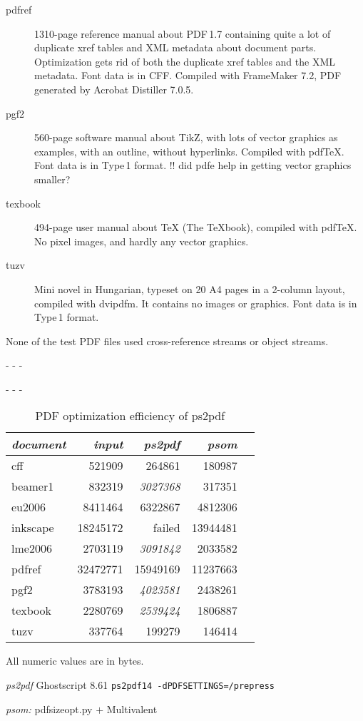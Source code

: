 \documentclass{ltugproc}
\def\cmd{\textsf}
\def\captiontop#1{%
  \advance\abovecaptionskip-\belowcaptionskip
  \advance\belowcaptionskip\abovecaptionskip
  \advance\abovecaptionskip-\belowcaptionskip
  \abovecaptionskip-\abovecaptionskip
  \caption{#1}%
  \advance\abovecaptionskip-\belowcaptionskip
  \advance\belowcaptionskip\abovecaptionskip
  \advance\abovecaptionskip-\belowcaptionskip
  \abovecaptionskip-\abovecaptionskip
}
\begin{document}
\begin{description}
\item[pdfref] 1310-page reference manual about PDF\,1.7 containing quite a
lot of duplicate xref tables and XML metadata about document parts.
Optimization gets rid of both the duplicate xref tables and the XML
metadata. Font data is in CFF. Compiled with FrameMaker 7.2, PDF generated
by Acrobat Distiller 7.0.5.

\item[pgf2] 560-page software manual about TikZ, with lots of vector
graphics as examples, with an outline, without hyperlinks. Compiled with
pdf\TeX{}. Font data is in Type\,1 format.
!! did pdfe help in getting vector graphics smaller?

\item[texbook] 494-page user manual about \TeX{} (The \TeX{}book), compiled
with pdf\TeX{}. No pixel images, and hardly any vector graphics.

\item[tuzv] Mini novel in Hungarian, typeset on 20 A4 pages in a 2-column
layout, compiled with \cmd{dvipdfm}. It contains no images or graphics. Font data
is in Type\,1 format.

\end{description}

\noindent None of the test PDF files used cross-reference streams or object streams.


\begin{table}
\captiontop{PDF optimization efficiency
of \cmd{ps2pdf}}\label{tab:eff-ps2pdf}
\par\small\noindent\hfil
\begin{tabular}{@{}lrrrr@{}}
\toprule
\emph{document} & \emph{input} & \emph{ps2pdf} & \emph{psom} \\\midrule
cff         &   521909 &   264861 &   180987 \\
beamer1     &   832319 &  \emph{3027368} &   317351 \\
eu2006      &  8411464 &  6322867 &  4812306 \\
inkscape    & 18245172 &  failed  & 13944481 \\
lme2006     &  2703119 &  \emph{3091842} &  2033582 \\
pdfref      & 32472771 & 15949169 & 11237663 \\
pgf2        &  3783193 &  \emph{4023581} &  2438261 \\
texbook     &  2280769 &  \emph{2539424} &  1806887 \\
tuzv        &   337764 &   199279 &   146414 \\
\bottomrule
\end{tabular}
\par\bigskip
\par\noindent All numeric values are in bytes.
\par\noindent\emph{ps2pdf} Ghostscript 8.61 \texttt{ps2pdf14 -dPDFSETTINGS=/prepress}
\par\noindent\emph{psom:} \cmd{pdfsizeopt.py} $+$ Multivalent
\end{table}
\end{document}
